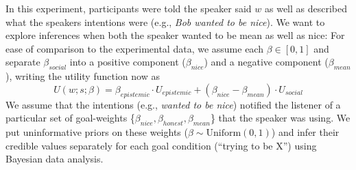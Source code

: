 \documentclass[10pt,letterpaper]{article}
\newcommand{\ndg}[1]{\textcolor{Green}{[ndg: #1]}}
\begin{document}
In this experiment, participants were told the speaker said $w$ as well as described what the speakers intentions were (e.g., \emph{Bob wanted to be nice}).
We want to explore inferences when both the speaker wanted to be mean as well as nice: For ease of comparison to the experimental data, we assume each $\beta \in [0,1]$ and separate $\beta_{social}$ into a positive component ($\beta_{nice}$) and a negative component ($\beta_{mean}$), writing the utility function now as
$$
 U(w;s; \beta)  =  \beta_{epistemic}\cdot U_{epistemic} + (\beta_{nice} - \beta_{mean}) \cdot U_{social}
 $$
We assume that the intentions (e.g., \emph{wanted to be nice}) notified the listener of a particular set of goal-weights \{$\beta_{nice}, \beta_{honest}, \beta_{mean}$\} that the speaker was using.
We put uninformative priors on these weights ($\beta \sim \text{Uniform}(0,1)$) and infer their credible values separately for each goal condition (``trying to be X'') using Bayesian data analysis.


\end{document}
